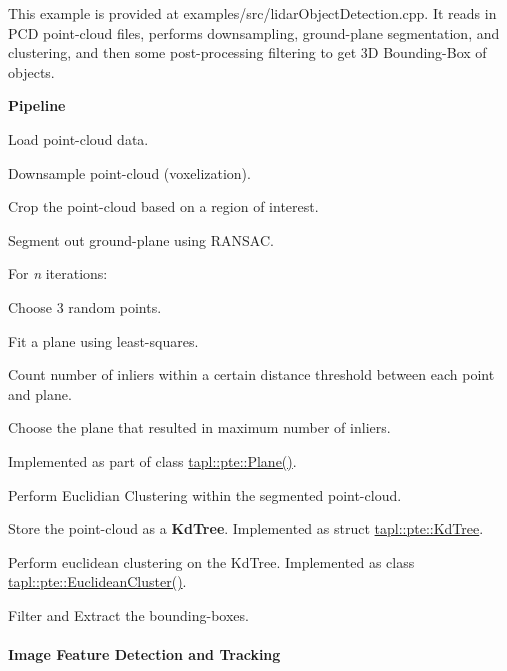This example is provided at {\ttfamily examples/src/lidar\+Object\+Detection.\+cpp}. It reads in P\+CD point-\/cloud files, performs downsampling, ground-\/plane segmentation, and clustering, and then some post-\/processing filtering to get 3D Bounding-\/\+Box of objects.

{\bfseries Pipeline}


\begin{DoxyItemize}
\item Load point-\/cloud data.
\item Downsample point-\/cloud (voxelization).
\item Crop the point-\/cloud based on a region of interest.
\item Segment out ground-\/plane using R\+A\+N\+S\+AC.
\begin{DoxyItemize}
\item For {\itshape n} iterations\+:
\begin{DoxyItemize}
\item Choose 3 random points.
\item Fit a plane using least-\/squares.
\item Count number of inliers within a certain distance threshold between each point and plane.
\end{DoxyItemize}
\item Choose the plane that resulted in maximum number of inliers.
\item Implemented as part of {\ttfamily class \hyperlink{classtapl_1_1pte_1_1Plane}{tapl\+::pte\+::\+Plane()}}.
\end{DoxyItemize}
\item Perform Euclidian Clustering within the segmented point-\/cloud.
\begin{DoxyItemize}
\item Store the point-\/cloud as a {\bfseries Kd\+Tree}. Implemented as {\ttfamily struct \hyperlink{structtapl_1_1pte_1_1KdTree}{tapl\+::pte\+::\+Kd\+Tree}}.
\item Perform euclidean clustering on the Kd\+Tree. Implemented as {\ttfamily class \hyperlink{classtapl_1_1pte_1_1EuclideanCluster}{tapl\+::pte\+::\+Euclidean\+Cluster()}}.
\end{DoxyItemize}
\item Filter and Extract the bounding-\/boxes.
\end{DoxyItemize}





\paragraph*{Image Feature Detection and Tracking}

